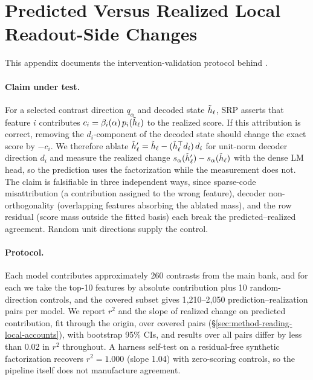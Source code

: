\section{Predicted Versus Realized Local Readout-Side Changes}
\label{app:causal-validation}

This appendix documents the intervention-validation protocol behind
.

\paragraph{Claim under test.}
For a selected contrast direction \(q_\alpha\) and decoded state
\(\tilde h_\ell\), SRP
asserts that feature \(i\) contributes
\(c_i=\beta_i(\alpha)\,p_i(\tilde h_\ell)\) to the realized score. If this attribution is
correct, removing the \(d_i\)-component of the decoded state should
change the exact score by \(-c_i\). We therefore ablate
\(\tilde h_\ell' = \tilde h_\ell - (\tilde h_\ell^\top d_i)\,d_i\) for
unit-norm decoder direction \(d_i\) and measure the realized change
\(s_\alpha(\tilde h_\ell')-s_\alpha(\tilde h_\ell)\) with the
dense LM head, so the prediction uses the factorization while the
measurement does not. The claim is falsifiable in three independent
ways, since sparse-code misattribution (a contribution assigned to the wrong
feature), decoder non-orthogonality (overlapping features absorbing the
ablated mass), and the row residual (score mass outside the fitted
basis) each break the predicted--realized agreement. Random unit
directions supply the control.

\paragraph{Protocol.}
Each model contributes approximately 260 contrasts from the main bank, and for
each we take the top-10 features by absolute contribution plus 10
random-direction controls, and the covered subset gives 1{,}210--2{,}050
prediction--realization pairs per model. We report \(r^2\) and the slope of realized change on
predicted contribution, fit through the origin, over covered
pairs (\S\ref{sec:method-reading-local-accounts}), with
bootstrap 95\% CIs, and results over all pairs differ by less than 0.02 in
\(r^2\) throughout. A harness self-test on a residual-free synthetic
factorization recovers \(r^2=1.000\) (slope 1.04) with zero-scoring
controls, so the pipeline itself does not manufacture
agreement.


